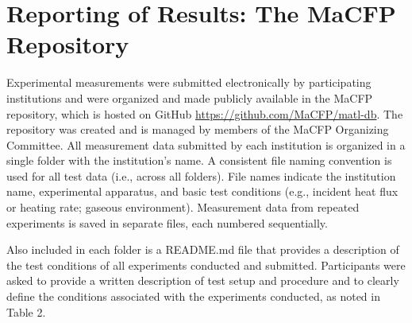 \documentclass{book}
\begin{document}
\section{Reporting of Results: The MaCFP Repository}

Experimental measurements were submitted electronically by participating institutions and were organized and made publicly available in the MaCFP repository, which is hosted on GitHub \href{https://github.com/MaCFP/matl-db}{https://github.com/MaCFP/matl-db}. The repository was created and is managed by members of the MaCFP Organizing Committee. All measurement data submitted by each institution is organized in a single folder with the institution’s name. A consistent file naming convention is used for all test data (i.e., across all folders). File names indicate the institution name, experimental apparatus, and basic test conditions (e.g., incident heat flux or heating rate; gaseous environment). Measurement data from repeated experiments is saved in separate files, each numbered sequentially.

Also included in each folder is a README.md file that provides a description of the test conditions of all experiments conducted and submitted. Participants were asked to provide a written description of test setup and procedure and to clearly define the conditions associated with the experiments conducted, as noted in Table 2.
\end{document}
